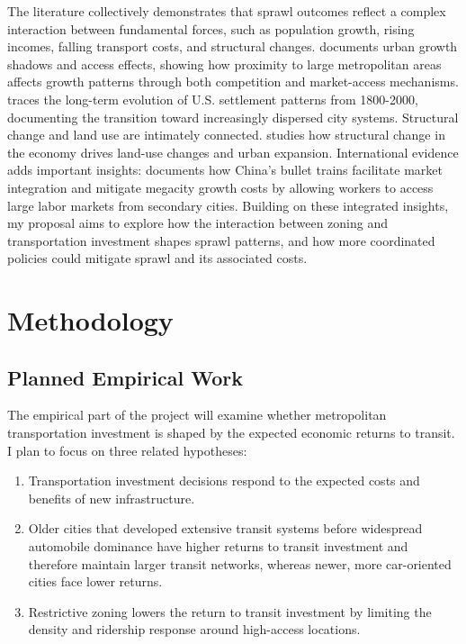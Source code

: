 \documentclass[12pt, a4paper]{article}
\begin{document}
The literature collectively demonstrates that sprawl outcomes reflect a complex interaction between fundamental forces, such as population growth, rising incomes, falling transport costs, and structural changes. \citet{Cuberes2021-vo} documents urban growth shadows and access effects, showing how proximity to large metropolitan areas affects growth patterns through both competition and market-access mechanisms. \citet{Desmet2017-kc} traces the long-term evolution of U.S. settlement patterns from 1800-2000, documenting the transition toward increasingly dispersed city systems. Structural change and land use are intimately connected. \citet{Coeurdacier2022-ip} studies how structural change in the economy drives land-use changes and urban expansion. International evidence adds important insights: \citet{Zheng2013-of} documents how China's bullet trains facilitate market integration and mitigate megacity growth costs by allowing workers to access large labor markets from secondary cities. Building on these integrated insights, my proposal aims to explore how the interaction between zoning and transportation investment shapes sprawl patterns, and how more coordinated policies could mitigate sprawl and its associated costs.

\section{Methodology}
\subsection{Planned Empirical Work}

The empirical part of the project will examine whether metropolitan transportation investment is shaped by the expected economic returns to transit. I plan to focus on three related hypotheses:
\begin{enumerate}
    \item Transportation investment decisions respond to the expected costs and benefits of new infrastructure.
    \item Older cities that developed extensive transit systems before widespread automobile dominance have higher returns to transit investment and therefore maintain larger transit networks, whereas newer, more car-oriented cities face lower returns.
    \item Restrictive zoning lowers the return to transit investment by limiting the density and ridership response around high-access locations.
\end{enumerate}
\end{document}
